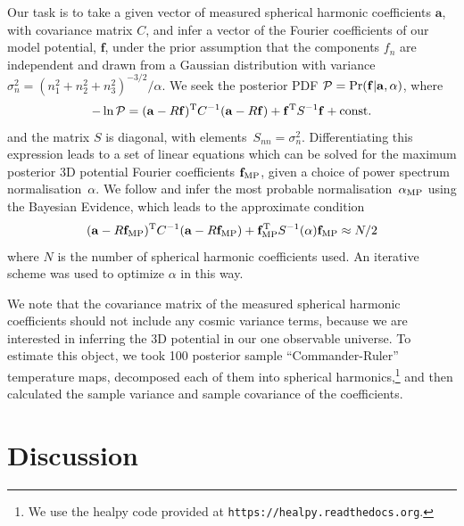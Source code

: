 \documentclass[12pt]{article}
\def\Response{R_{yn}}
\def\ResponseMatrix{R}
\begin{document}
Our task is to take a given vector of measured spherical harmonic
coefficients $\mathbf{a}$, with covariance matrix $C$,  and
infer a vector of the Fourier coefficients of our model potential,
$\mathbf{f}$,  under the prior assumption that the  components $f_n$
are independent and drawn from a Gaussian distribution with variance
$\sigma_n^2 = (n_1^2+n_2^2+n_3^2)^{-3/2} / \alpha$. We seek the
posterior PDF ${\cal P} = \Pr(\mathbf{f}|\mathbf{a},\alpha)$, where
\begin{equation}
-\ln{\cal P} = (\mathbf{a}-\ResponseMatrix\mathbf{f})^{\rm T} C^{-1} (\mathbf{a}-\ResponseMatrix\mathbf{f})
             + \mathbf{f}^{\rm T} S^{-1} \mathbf{f} + \text{const.}
\end{equation}
and the matrix $S$ is diagonal, with
elements~$S_{nn} = \sigma_n^2$.
Differentiating this expression leads to a set of linear equations
which can be solved for the maximum posterior 3D potential
Fourier coefficients $\mathbf{f}_{\rm MP}$, given a choice of power spectrum
normalisation~$\alpha$. We follow \citep{SuyuEtal2006} and infer the
most probable normalisation~$\alpha_{\rm MP}$ using the Bayesian Evidence,
which leads to the approximate condition
\begin{equation}
    (\mathbf{a}-\ResponseMatrix\mathbf{f}_{\rm MP})^{\rm T} C^{-1} (\mathbf{a}-\ResponseMatrix\mathbf{f}_{\rm MP})
                 + \mathbf{f}_{\rm MP}^{\rm T} S^{-1}(\alpha) \mathbf{f}_{\rm MP} \approx N/2
\end{equation}
where $N$ is the number of spherical harmonic coefficients used. An
iterative scheme was used to optimize $\alpha$ in this way.

We note that the covariance matrix of the measured spherical harmonic
coefficients should not include any cosmic variance terms, because we
are interested in inferring the 3D potential in our one observable
universe. To estimate this object, we took 100 posterior sample
``Commander-Ruler'' temperature maps, decomposed each of them into
spherical harmonics,\footnote{We use the {\sc healpy} code provided at
\texttt{https://healpy.readthedocs.org}.} and then calculated the
sample variance and sample covariance of the coefficients.


\section{Discussion}




\end{document}
